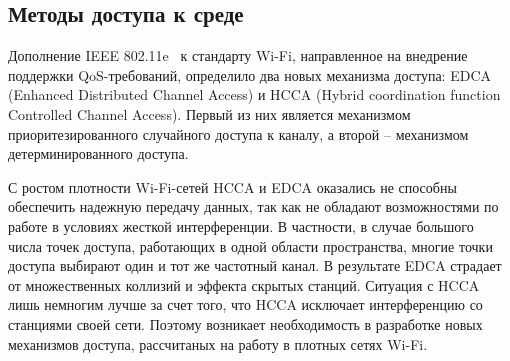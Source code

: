 \subsection{Методы доступа к среде}
\label{sec:methods}




Дополнение IEEE 802.11e~\cite{802.11e} к стандарту Wi-Fi, направленное на внедрение поддержки QoS-требований, определило два новых механизма доступа: EDCA (Enhanced Distributed Channel Access) и HCCA (Hybrid coordination function Controlled Channel Access). Первый из них является механизмом приоритезированного случайного доступа к каналу, а второй -- механизмом детерминированного доступа.

С ростом плотности Wi-Fi-сетей HCCA и EDCA оказались не способны обеспечить надежную передачу данных, так как не обладают возможностями по работе в условиях жесткой интерференции. В частности, в случае большого числа точек доступа, работающих в одной области пространства, многие точки доступа выбирают один и тот же частотный канал. В результате EDCA страдает от множественных коллизий и эффекта скрытых станций. Ситуация с HCCA лишь немногим лучше за счет того, что HCCA исключает интерференцию со станциями своей сети. Поэтому возникает необходимость в разработке новых механизмов доступа, рассчитаных на работу в плотных сетях Wi-Fi.

